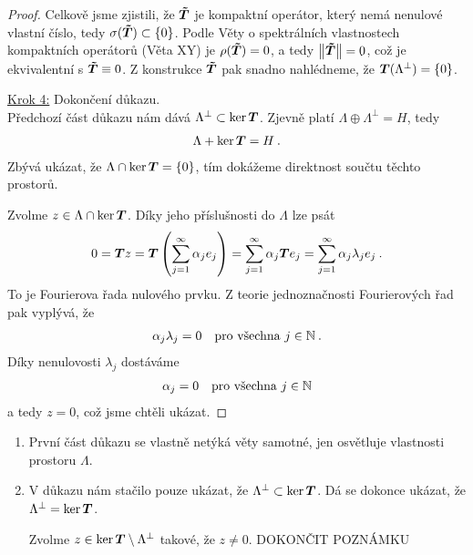 \begin{proof}
Celkově jsme zjistili, že $\boldsymbol{\tilde T}$ je kompaktní operátor, který nemá nenulové vlastní číslo, tedy $\sigma(\boldsymbol{\tilde T}) \subset \{ 0 \}$. Podle Věty o spektrálních vlastnostech kompaktních operátorů (Věta XY) je $\rho(\boldsymbol{\tilde T}) = 0$, a tedy  $\left\lVert\boldsymbol{\tilde T}\right\rVert =0$, což je ekvivalentní s $\boldsymbol{\tilde T} \equiv 0$. Z konstrukce $\boldsymbol{\tilde T}$ pak snadno nahlédneme, že $\boldsymbol{T}(\Lambda^\bot)= \{0 \}$.

\underline{Krok 4:} Dokončení důkazu. \\
Předchozí část důkazu nám dává $\Lambda^\bot \subset \mathrm{ker}\, \boldsymbol{T}$. Zjevně platí $\Lambda \oplus \Lambda^\bot = H$, tedy \begin{align*}
    \Lambda + \mathrm{ker}\, \boldsymbol{T} = H \:.
\end{align*}
Zbývá ukázat, že $\Lambda \cap \mathrm{ker}\, \boldsymbol{T} = \{0 \}$, tím dokážeme direktnost součtu těchto prostorů.

Zvolme $z \in \Lambda \cap \mathrm{ker}\, \boldsymbol{T}$. Díky jeho příslušnosti do $\Lambda$ lze psát \begin{align*}
    0 = \boldsymbol{T} z = \boldsymbol{T} \left( \sum_{j=1}^\infty \alpha_j e_j \right) =  \sum_{j=1}^\infty \alpha_j \boldsymbol{T} e_j =  \sum_{j=1}^\infty \alpha_j \lambda_j e_j \:.
\end{align*}
To je Fourierova řada nulového prvku. Z teorie jednoznačnosti Fourierových řad pak vyplývá, že \begin{align*}
    \alpha_j \lambda_j =0 \quad \text{pro všechna } j \in \mathbb{N} \:.
\end{align*}
Díky nenulovosti $\lambda_j$ dostáváme \begin{align}
    \alpha_j =0 \quad \text{pro všechna } j \in \mathbb{N}
\end{align}
a tedy $z = 0$, což jsme chtěli ukázat.
\end{proof}

\begin{remark}
\begin{enumerate}
    \item První část důkazu se vlastně netýká věty samotné, jen osvětluje vlastnosti prostoru $\Lambda$.
    \item V důkazu nám stačilo pouze ukázat, že $\Lambda^\bot \subset \ker \boldsymbol{T}$. Dá se dokonce ukázat, že $\Lambda^\bot = \ker \boldsymbol{T}$.
    
    Zvolme $z \in \ker \boldsymbol{T} \setminus \Lambda^\bot $ takové, že $z \neq 0$. DOKONČIT POZNÁMKU
\end{enumerate}
\end{remark}

